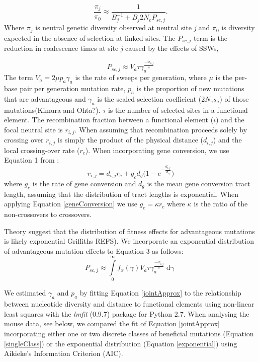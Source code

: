 \begin{equation}
\label{jointApprox}
\frac{\pi_{j}}{\pi_{0}} \approx  \frac{1}{B_{j}^{-1}  + B_{j}2N_eP_{sc,j}}.
\end{equation}
	Where $\pi_j$ is neutral genetic diversity observed at neutral site \textit{j} and $\pi_0$ is diversity expected in the absence of selection at linked sites. The $P_{sc,j}$ term is the reduction in coalescence times at site \textit{j} caused by the effects of SSWs,

\begin{equation}
\label{singleClass}
P_{sc,j} \approx V_a \tau\gamma_a^{\frac{-4r_{i,j}}{s}} 
\end{equation}
The term $V_{a} = 2 \mu p_{a} \gamma_{a}$ is the rate of sweeps per generation, where $\mu$ is the per-base pair per generation mutation rate, $p_a$ is the proportion of new mutations that are advantageous and $\gamma_a$ is the scaled selection coefficient ($2N_es_a$) of those mutations(Kimura and Ohta?). $\tau$ is the number of selected sites in a functional element. The recombination fraction between a functional element ($i$) and the focal neutral site is $r_{i,j}$. When assuming that recombination proceeds solely by crossing over $r_{i,j}$ is simply the product of the physical distance ($d_{i,j}$) and the local crossing-over rate ($r_c$). When incorporating gene conversion, we use Equation 1 from  \cite{RN361}:
 		\begin{equation}
		\label{geneConversion}
		r_{i,j} = d_{i,j} r_c + g_c d_g \Bigg( 1 - e ^{-\frac{d_{i,j}}{d_g}} \Bigg)
		\end{equation} where $g_c$ is the rate of gene conversion and $d_g$ is the mean gene conversion tract length, assuming that the distribution of tract lengths is exponential. When applying Equation \ref{geneConversion} we use $g_c = \kappa r_c$ where $\kappa$ is the ratio of the non-crossovers to crossovers.
	
	Theory suggest that the distribution of fitness effects for advantageous mutations is likely exponential \cite{RN362} Griffiths REFS). We incorporate an exponential distribution of advantageous mutation effects to Equation 3 as follows:
		\begin{equation}
		\label{exponential}
P_{sc,j} \approx \int \limits_{0}^{\infty} f_x(\gamma) V_a \tau\gamma_a^{\frac{-4r_{i,j}}{s}} \mathop{d\gamma}
		\end{equation}

	
	We estimated $\gamma_a$ and $p_a$ by fitting Equation \ref{jointApprox} to the relationship between nucleotide diversity and distance to functional elements using non-linear least squares with the \emph{lmfit} (0.9.7) package for Python 2.7. When analysing the mouse data, see below, we compared the fit of Equation \ref{jointApprox} incorporating either one or two discrete classes of beneficial mutations (Equation \ref{singleClass}) or the exponential distribution (Equation \ref{exponential}) using Aikieke's Information Criterion (AIC).
	
